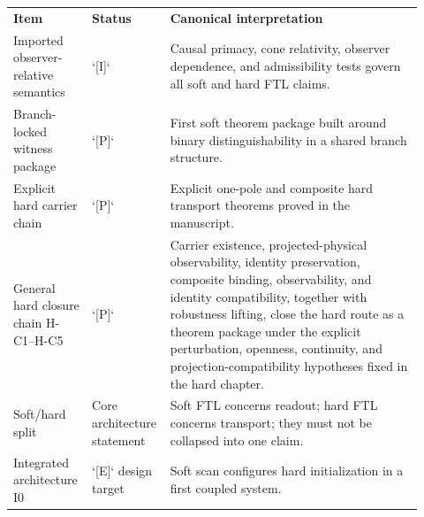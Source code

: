 \begin{tabular}{L{0.18\linewidth}L{0.14\linewidth}L{0.6\linewidth}}
\textbf{Item} & \textbf{Status} & \textbf{Canonical interpretation} \\
Imported observer-relative semantics & `[I]` & Causal primacy, cone relativity, observer dependence, and admissibility tests govern all soft and hard FTL claims. \\
Branch-locked witness package & `[P]` & First soft theorem package built around binary distinguishability in a shared branch structure. \\
Explicit hard carrier chain & `[P]` & Explicit one-pole and composite hard transport theorems proved in the manuscript. \\
General hard closure chain H-C1--H-C5 & `[P]` & Carrier existence, projected-physical observability, identity preservation, composite binding, observability, and identity compatibility, together with robustness lifting, close the hard route as a theorem package under the explicit perturbation, openness, continuity, and projection-compatibility hypotheses fixed in the hard chapter. \\
Soft/hard split & Core architecture statement & Soft FTL concerns readout; hard FTL concerns transport; they must not be collapsed into one claim. \\
Integrated architecture I0 & `[E]` design target & Soft scan configures hard initialization in a first coupled system. \\
\end{tabular}